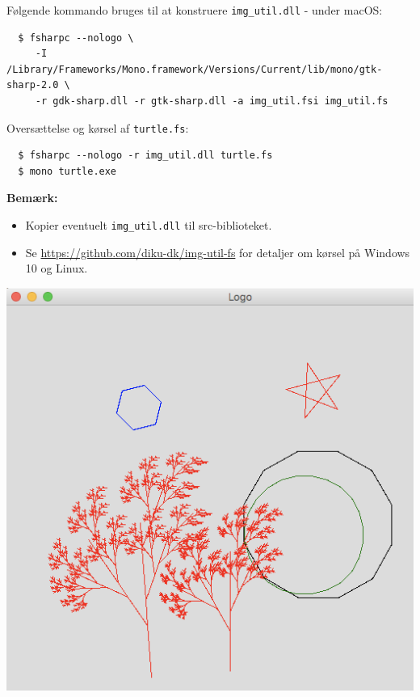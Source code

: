 \documentclass[rgb]{beamer}
\begin{document}
\begin{frame}[fragile]
\begin{footnotesize}


Følgende kommando bruges til at konstruere \lstinline{img_util.dll} - under macOS:

\begin{tiny}
\begin{verbatim}
  $ fsharpc --nologo \
     -I /Library/Frameworks/Mono.framework/Versions/Current/lib/mono/gtk-sharp-2.0 \
     -r gdk-sharp.dll -r gtk-sharp.dll -a img_util.fsi img_util.fs
\end{verbatim}
\end{tiny}

\vspace{3mm}

\begin{minipage}{.72\textwidth}
Oversættelse og kørsel af \lstinline{turtle.fs}:

\begin{verbatim}
  $ fsharpc --nologo -r img_util.dll turtle.fs
  $ mono turtle.exe
\end{verbatim}

\vspace{2mm}

\textbf{Bemærk:}

\begin{itemize}
\item Kopier eventuelt \lstinline{img_util.dll} til src-biblioteket.
  \item Se \url{https://github.com/diku-dk/img-util-fs} for
detaljer om kørsel på Windows 10 og Linux.
\end{itemize}
\end{minipage}\hfill
\begin{minipage}{.25\textwidth}
  \vspace{0pt}
  \includegraphics[width=.9\textwidth]{../images/turtle.png}
\end{minipage}


\end{footnotesize}
\end{frame}
\end{document}

